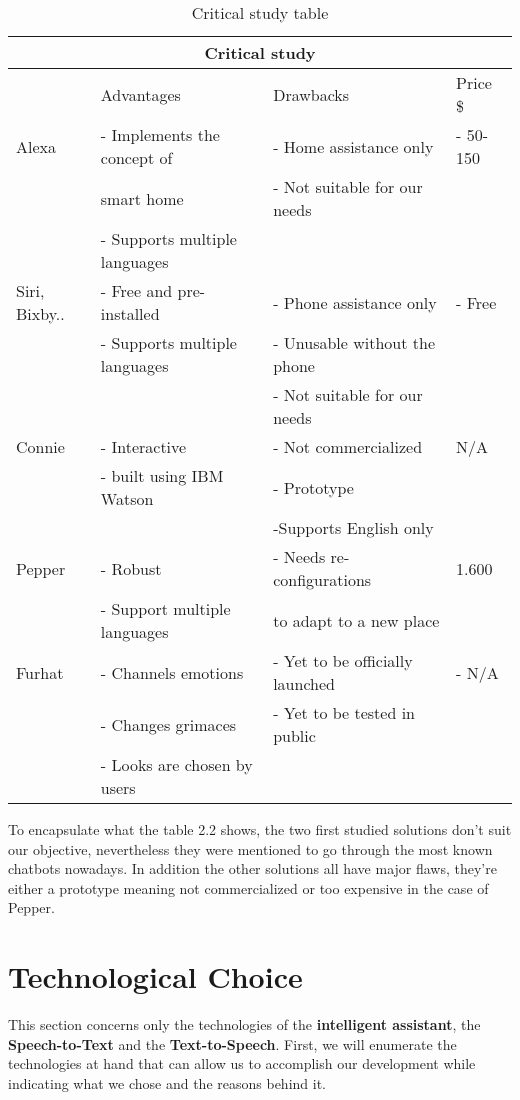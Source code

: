 \begin{table}[hbt!]
\label{tab:critical study}
\centering
\begin{tabular}{ |l||l|l|l|  }
 \hline
 \multicolumn{4}{|c|}{Critical study} \\
 \hline
    &Advantages & Drawbacks &Price \$ \\
 \hline
 \hline
 Alexa   & - Implements the concept of  &   - Home assistance only &  - 50-150 \\
  & smart home& - Not suitable for our needs & \\
  & - Supports multiple languages & & \\ 
 \hline
 Siri, Bixby.. & - Free and pre-installed &  - Phone assistance only  & - Free \\
  & - Supports multiple languages & - Unusable without the phone & \\
   &  & - Not suitable for our needs& \\
  \hline 
  Connie & - Interactive & - Not commercialized & N/A \\
   & - built using IBM Watson & - Prototype & \\
    & & -Supports English only & \\
    \hline
    Pepper & - Robust & - Needs re-configurations & 1.600\\
     & - Support multiple languages & to adapt to a new place & \\
     \hline
     Furhat & - Channels emotions & - Yet to be officially launched & - N/A \\
      & - Changes grimaces & - Yet to be tested in public & \\
       & - Looks are chosen by users & & \\
       \hline
\end{tabular}
\caption{Critical study table}
\end{table}
To encapsulate what the table 2.2 shows, the two first studied solutions don't suit our objective, nevertheless they were mentioned to go through the most known chatbots nowadays. In addition the other solutions all have major flaws, they're either a prototype meaning not commercialized or too expensive in the case of Pepper.      

\section{Technological Choice}
This section concerns only the technologies of the \textbf{intelligent assistant}, the \textbf{Speech-to-Text} and the \textbf{Text-to-Speech}.
First, we will enumerate the technologies at hand that can allow us to accomplish our development while indicating what we chose and the reasons behind it.   
